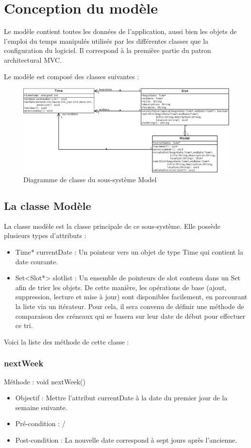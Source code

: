 \chapter{Conception du modèle}
	
	Le modèle contient toutes les données de l'application, aussi bien les objets de l'emploi du temps manipulés utilisés par les différentes classes que la configuration du logiciel. Il correspond à la première partie du patron architectural MVC. 
	
	Le modèle est composé des classes suivantes :
	\begin{figure}
		\centering
		\includegraphics[scale=0.45]{diagclasses_model.png}
		\caption{Diagramme de classe du sous-système \og Model \fg{}}
	\end{figure}
	\FloatBarrier
	
	\section{La classe Modèle}
	La classe modèle est la classe principale de ce sous-système. Elle possède plusieurs types d'attributs :
	\begin{itemize}
		\item Time* currentDate : Un pointeur vers un objet de type Time qui contient la date courante.
        \item Set<Slot*> slotlist : Un ensemble de pointeurs de slot contenu dans un Set afin de trier les objets. De cette manière, les opérations de base (ajout, suppression, lecture et mise à jour) sont disponibles facilement, en parcourant la liste via un itérateur. Pour cela, il sera convenu de définir une méthode de comparaison des créneaux qui se basera sur leur date de début pour effectuer ce tri.
	\end{itemize}
	
	Voici la liste des méthode de cette classe :
		\subsection*{nextWeek}
            Méthode : void nextWeek()
			\begin{itemize}
				\item Objectif  : Mettre l'attribut currentDate à la date du premier jour de la semaine suivante.
				\item Pré-condition : /
				\item Post-condition : La nouvelle date correspond à sept jours après l'ancienne.
			\end{itemize}
			
